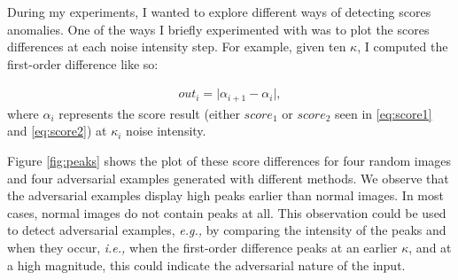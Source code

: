 During my experiments, I wanted to explore different ways of detecting scores
anomalies. One of the ways I briefly experimented with was to plot the scores
differences at each noise intensity step. For example, given ten $\kappa$, I
computed the first-order difference like so:

\begin{align}
    \label{eq:first-order-diff}
    out_i= \lvert \alpha_{i+1} - \alpha_{i} \rvert,
\end{align}
where $\alpha_i$ represents the score result (either $score_1$ or $score_2$ seen
in \ref{eq:score1} and \ref{eq:score2}) at $\kappa_i$ noise intensity.

Figure \ref{fig:peaks} shows the plot of these score differences for four random
images and four adversarial examples generated with different methods. We
observe that the adversarial examples display high peaks earlier than normal
images. In most cases, normal images do not contain peaks at all. This
observation could be used to detect adversarial examples, \emph{e.g.,} by
comparing the intensity of the peaks and when they occur, \emph{i.e.,} when the
first-order difference peaks at an earlier $\kappa$, and at a high magnitude,
this could indicate the adversarial nature of the input.

